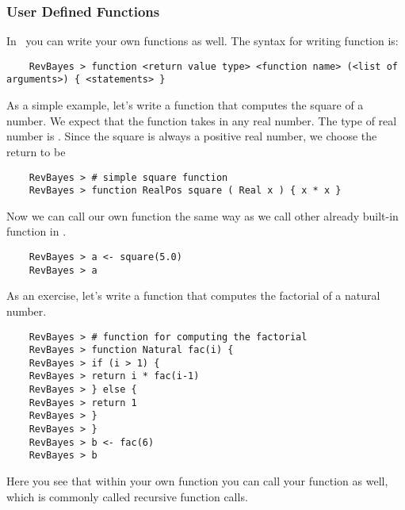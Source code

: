 \subsubsection*{User Defined Functions}
In \Rev~you can write your own functions as well.
The syntax for writing function is:
{\tt \begin{snugshade*}
\begin{lstlisting}    
    RevBayes > function <return value type> <function name> (<list of arguments>) { <statements> }
\end{lstlisting}
\end{snugshade*}}
As a simple example, let's write a function that computes the square of a number.
We expect that the function takes in any real number.
The type of real number is .
Since the square is always a positive real number, we choose the return to be 
{\tt \begin{snugshade*}
\begin{lstlisting}    
    RevBayes > # simple square function
    RevBayes > function RealPos square ( Real x ) { x * x }
\end{lstlisting}
\end{snugshade*}}
Now we can call our own function the same way as we call other already built-in function in \RevBayes.
{\tt \begin{snugshade*}
\begin{lstlisting}    
    RevBayes > a <- square(5.0)
    RevBayes > a
\end{lstlisting}
\end{snugshade*}}
As an exercise, let's write a function that computes the factorial of a natural number.
{\tt \begin{snugshade*}
\begin{lstlisting}    
    RevBayes > # function for computing the factorial
    RevBayes > function Natural fac(i) {
    RevBayes > if (i > 1) {
    RevBayes > return i * fac(i-1)
    RevBayes > } else {
    RevBayes > return 1
    RevBayes > }
    RevBayes > }
    RevBayes > b <- fac(6)
    RevBayes > b
\end{lstlisting}
\end{snugshade*}}
Here you see that within your own function you can call your function as well, which is commonly called recursive function calls.

